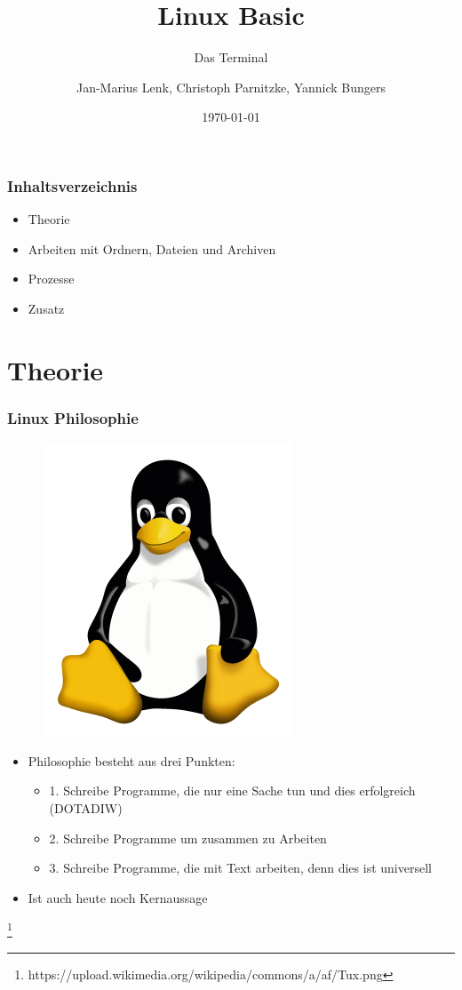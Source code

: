 \documentclass[12pt,utf8, handout]{beamer}
\title{Linux Basic}
\subtitle{Das Terminal}
\author[J.-M. Lenk, C. Parnitzke, Y. Bungers]{Jan-Marius Lenk, Christoph Parnitzke, Yannick Bungers}
\institute[FOSS AG]{Free and Open Source Software AG\\ Fakultät für Informatik}
\date{\today}
\begin{document}
\titlepage

\begin{frame}
\frametitle{Inhaltsverzeichnis}
\begin{itemize}
	\item Theorie
	\item Arbeiten mit Ordnern, Dateien und Archiven
	\item Prozesse
	\item Zusatz
\end{itemize}
\end{frame}

\section{Theorie}
\begin{frame}
\frametitle{Linux Philosophie}
\begin{figure}
\includegraphics[scale=0.3]{res/tux.png}
\end{figure}
\begin{itemize}
	\item Philosophie besteht aus drei Punkten:
	\begin{itemize}
		\item 1. Schreibe Programme, die nur eine Sache tun und dies erfolgreich (DOTADIW)
		\item 2. Schreibe Programme um zusammen zu Arbeiten
		\item 3. Schreibe Programme, die mit Text arbeiten, denn dies ist universell
	\end{itemize}
	\item Ist auch heute noch Kernaussage
\end{itemize}
\footnote{https://upload.wikimedia.org/wikipedia/commons/a/af/Tux.png}
\end{frame}
\end{document}
